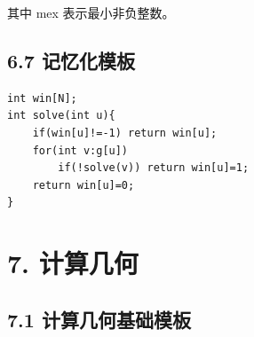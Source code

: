 \documentclass[UTF8,a4paper,11pt]{ctexart}
\begin{document}
其中 mex 表示最小非负整数。

\subsection*{6.7 记忆化模板}

\begin{Verbatim}[fontsize=\small,frame=single,breaklines=true,breakanywhere=true]
int win[N];
int solve(int u){
    if(win[u]!=-1) return win[u];
    for(int v:g[u])
        if(!solve(v)) return win[u]=1;
    return win[u]=0;
}
\end{Verbatim}
\section*{7. 计算几何}

\subsection*{7.1 计算几何基础模板}
\end{document}
